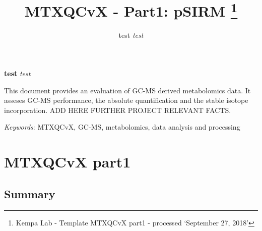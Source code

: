 \documentclass[9pt,]{article}
\title{MTXQCvX - Part1: pSIRM \thanks{Kempa Lab - Template MTXQCvX part1 - processed `September 27, 2018'}  }
\author{\Large test\vspace{0.05in} \newline\normalsize\emph{test}  }
\date{}
\newcommand*{\authorfont}{\fontfamily{phv}\selectfont}
\renewenvironment{abstract}
 {{%
    \setlength{\leftmargin}{0mm}
    \setlength{\rightmargin}{\leftmargin}%
  }%
  \relax}
 {\endlist}
\begin{document}
	
%

{%
\setlength{\parindent}{0pt}
\thispagestyle{plain}
{\fontsize{18}{20}\selectfont\raggedright 
\maketitle  %

}

{
   \vskip 13.5pt\relax \normalsize\fontsize{11}{12} 
\textbf{\authorfont test} \hskip 15pt \emph{\small test}   

}

}



{
\hypersetup{linkcolor=black}
\setcounter{tocdepth}{2}
\tableofcontents
}




\begin{abstract}

    \hbox{\vrule height .2pt width 39.14pc}

    \vskip 8.5pt %

\noindent This document provides an evaluation of GC-MS derived metabolomics data.
It asseses GC-MS performance, the absolute quantification and the stable
isotope incorporation. ADD HERE FURTHER PROJECT RELEVANT FACTS.


\vskip 8.5pt \noindent \emph{Keywords}: MTXQCvX, GC-MS, metabolomics, data analysis and processing \par

    \hbox{\vrule height .2pt width 39.14pc}



\end{abstract}


\vskip 6.5pt

\noindent  \section{MTXQCvX part1}\label{mtxqcvx-part1}

\subsection{Summary}\label{summary}
\end{document}
